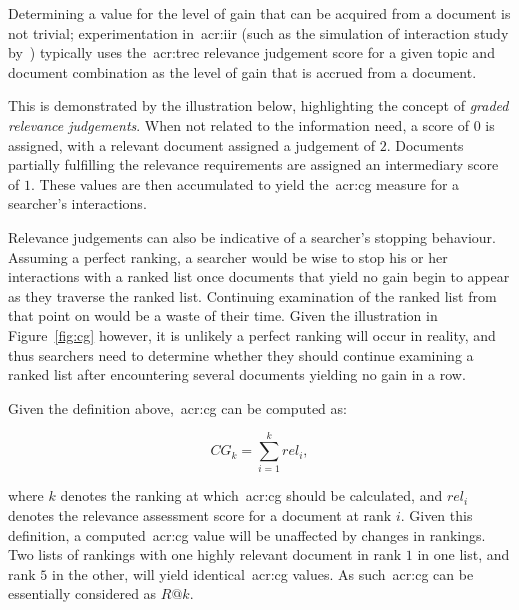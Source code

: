 Determining a value for the level of gain that can be acquired from a document is not trivial; experimentation in~\gls{acr:iir} (such as the simulation of interaction study by~\cite{pakkonen2015behavioural_dimensions}) typically uses the~\gls{acr:trec} relevance judgement score for a given topic and document combination as the level of gain that is accrued from a document.

This is demonstrated by the illustration below, highlighting the concept of \emph{graded relevance judgements}. When not related to the information need, a score of $0$ is assigned, with a relevant document assigned a judgement of $2$. Documents partially fulfilling the relevance requirements are assigned an intermediary score of $1$. These values are then accumulated to yield the~\gls{acr:cg} measure for a searcher's interactions.

\vspace{5mm}
\begin{figure}[h!]
    \centering
    \label{fig:graded}
\end{figure}

Relevance judgements can also be indicative of a searcher's stopping behaviour. Assuming a perfect ranking, a searcher would be wise to stop his or her interactions with a ranked list once documents that yield no gain begin to appear as they traverse the ranked list. Continuing examination of the ranked list from that point on would be a waste of their time. Given the illustration in Figure~\ref{fig:cg} however, it is unlikely a perfect ranking will occur in reality, and thus searchers need to determine whether they should continue examining a ranked list after encountering several documents yielding no gain in a row.

Given the definition above,~\gls{acr:cg} can be computed as:

\begin{equation}
    CG_k = \sum_{i=1}^{k} rel_i,
\end{equation}

where $k$ denotes the ranking at which~\gls{acr:cg} should be calculated, and $rel_i$ denotes the relevance assessment score for a document at rank $i$. Given this definition, a computed~\gls{acr:cg} value will be unaffected by changes in rankings. Two lists of rankings with one highly relevant document in rank $1$ in one list, and rank $5$ in the other, will yield identical~\gls{acr:cg} values. As such~\gls{acr:cg} can be essentially considered as $R@k$.

